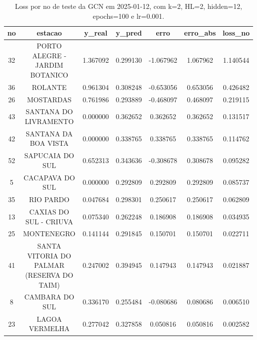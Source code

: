 \begin{table}[h]
\centering
\caption{Loss por no de teste da GCN em 2025-01-12, com k=2, HL=2, hidden=12, epochs=100 e lr=0.001.}
\label{tab:gcn_loss_k2_hl2_h12_e100_d20250112}
\begin{tabular}{ccccccc}
\toprule
no & estacao & y\_real & y\_pred & erro & erro\_abs & loss\_no \\
\midrule
32 & PORTO ALEGRE - JARDIM BOTANICO & 1.367092 & 0.299130 & -1.067962 & 1.067962 & 1.140544 \\
36 & ROLANTE & 0.961304 & 0.308248 & -0.653056 & 0.653056 & 0.426482 \\
26 & MOSTARDAS & 0.761986 & 0.293889 & -0.468097 & 0.468097 & 0.219115 \\
43 & SANTANA DO LIVRAMENTO & 0.000000 & 0.362652 & 0.362652 & 0.362652 & 0.131517 \\
42 & SANTANA DA BOA VISTA & 0.000000 & 0.338765 & 0.338765 & 0.338765 & 0.114762 \\
52 & SAPUCAIA DO SUL & 0.652313 & 0.343636 & -0.308678 & 0.308678 & 0.095282 \\
5 & CACAPAVA DO SUL & 0.000000 & 0.292809 & 0.292809 & 0.292809 & 0.085737 \\
35 & RIO PARDO & 0.047684 & 0.298301 & 0.250617 & 0.250617 & 0.062809 \\
13 & CAXIAS DO SUL - CRIUVA & 0.075340 & 0.262248 & 0.186908 & 0.186908 & 0.034935 \\
25 & MONTENEGRO & 0.141144 & 0.291845 & 0.150701 & 0.150701 & 0.022711 \\
41 & SANTA VITORIA DO PALMAR (RESERVA DO TAIM) & 0.247002 & 0.394945 & 0.147943 & 0.147943 & 0.021887 \\
8 & CAMBARA DO SUL & 0.336170 & 0.255484 & -0.080686 & 0.080686 & 0.006510 \\
23 & LAGOA VERMELHA & 0.277042 & 0.327858 & 0.050816 & 0.050816 & 0.002582 \\
\bottomrule
\end{tabular}
\end{table}
